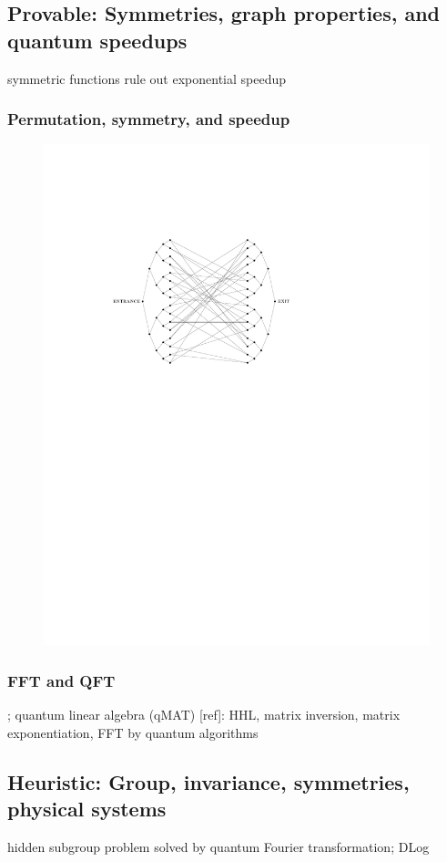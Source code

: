 \subsection{Provable: Symmetries, graph properties, and quantum speedups}
symmetric functions rule out exponential speedup
\cite{ben-davidSymmetriesGraphProperties2020}

\subsubsection{Permutation, symmetry, and speedup}
\begin{figure}[!ht]
	\centering
	\includegraphics[width=.6\linewidth]{glued_tree.pdf}
	\caption{\cite{childsExponentialAlgorithmicSpeedup2003}}
\end{figure}

\subsubsection{FFT and QFT}
\cite{kondorGraphletSpectrum2009};
quantum linear algebra (qMAT) [ref]: HHL, matrix inversion, matrix exponentiation, FFT by quantum algorithms
\cite{sornsaengQuantumDiffusionMap2021}

\subsection{Heuristic: Group, invariance, symmetries, physical systems}
hidden subgroup problem solved by quantum Fourier transformation\cite{childsQuantumAlgorithmsAlgebraic2010};
DLog \cite{zhengSpeedingLearningQuantum2022}

